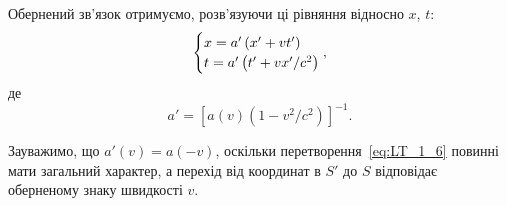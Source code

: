 Обернений зв'язок отримуємо, розв'язуючи ці рівняння відносно $x$, $t$:
\begin{equation}\label{eq:LT_1_7}
\begin{cases}
		x=a'\left(x'+vt'\right) \\
		t=a'\left(t'+vx'/c^2\right)
\end{cases}\kern-1em,
\end{equation}
де
\begin{equation} \label{eq:LT_1_8}
	a'={\left[a\left(v\right)\left(1-v^2/c^2\right)\right]}^{-1}.
\end{equation}

Зауважимо, що $a'(v)=a(-v)$, оскільки перетворення~\eqref{eq:LT_1_6} повинні мати загальний характер, а перехід від
координат в $S'$ до $S$ відповідає оберненому знаку швидкості $v$.

